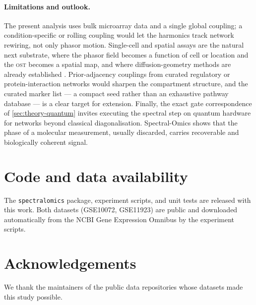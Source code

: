 \documentclass[preprint,12pt,amsmath,amssymb,superscriptaddress,floatfix]{revtex4-2}
\theoremstyle{definition}
\theoremstyle{plain}
\newcommand{\OST}{\textsc{ost}}
\begin{document}
\paragraph{Limitations and outlook.}
The present analysis uses bulk microarray data and a single global coupling; a
condition-specific or rolling coupling would let the harmonics track network
rewiring, not only phasor motion. Single-cell and spatial assays are the natural
next substrate, where the phasor field becomes a function of cell or location and
the \OST{} becomes a spatial map, and where diffusion-geometry methods are
already established \citep{haghverdi2015diffusion}. Prior-adjacency couplings from
curated regulatory or protein-interaction networks \citep{barabasi2011network}
would sharpen the compartment structure, and the curated marker list --- a
compact seed rather than an exhaustive pathway database --- is a clear target for
extension. Finally, the exact gate correspondence of \cref{sec:theory-quantum}
invites executing the spectral step on quantum hardware for networks beyond
classical diagonalisation. Spectral-Omics shows that the phase of a molecular
measurement, usually discarded, carries recoverable and biologically coherent
signal.

\section*{Code and data availability}
The \texttt{spectralomics} package, experiment scripts, and unit tests are
released with this work. Both datasets (GSE10072, GSE11923) are public and
downloaded automatically from the NCBI Gene Expression Omnibus
\citep{edgar2002geo} by the experiment scripts.

\section*{Acknowledgements}
We thank the maintainers of the public data repositories whose datasets made
this study possible.



\end{document}
